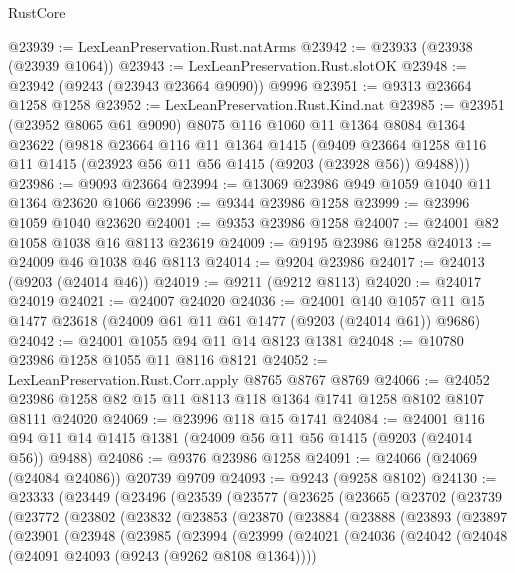 \begin{lexlean}{RustCore}
\begin{coremodule}
@23939 := LexLeanPreservation.Rust.natArms
@23942 := @23933 (@23938 (@23939 @1064))
@23943 := LexLeanPreservation.Rust.slotOK
@23948 := @23942 (@9243 (@23943 @23664 @9090)) @9996
@23951 := @9313 @23664 @1258 @1258
@23952 := LexLeanPreservation.Rust.Kind.nat
@23985 := @23951
    (@23952 @8065 @61 @9090)
    @8075
    @116
    @1060
    @11
    @1364
    @8084
    @1364
    @23622
    (@9818
      @23664
      @116
      @11
      @1364
      @1415
      (@9409 @23664 @1258 @116 @11 @1415 (@23923 @56 @11 @56 @1415 (@9203 (@23928 @56)) @9488)))
@23986 := @9093 @23664
@23994 := @13069 @23986 @949 @1059 @1040 @11 @1364 @23620 @1066
@23996 := @9344 @23986 @1258
@23999 := @23996 @1059 @1040 @23620
@24001 := @9353 @23986 @1258
@24007 := @24001 @82 @1058 @1038 @16 @8113 @23619
@24009 := @9195 @23986 @1258
@24013 := @24009 @46 @1038 @46 @8113
@24014 := @9204 @23986
@24017 := @24013 (@9203 (@24014 @46))
@24019 := @9211 (@9212 @8113)
@24020 := @24017 @24019
@24021 := @24007 @24020
@24036 := @24001
    @140
    @1057
    @11
    @15
    @1477
    @23618
    (@24009 @61 @11 @61 @1477 (@9203 (@24014 @61)) @9686)
@24042 := @24001 @1055 @94 @11 @14 @8123 @1381
@24048 := @10780 @23986 @1258 @1055 @11 @8116 @8121
@24052 := LexLeanPreservation.Rust.Corr.apply @8765 @8767 @8769
@24066 := @24052 @23986 @1258 @82 @15 @11 @8113 @118 @1364 @1741 @1258 @8102 @8107 @8111 @24020
@24069 := @23996 @118 @15 @1741
@24084 := @24001 @116 @94 @11 @14 @1415 @1381 (@24009 @56 @11 @56 @1415 (@9203 (@24014 @56)) @9488)
@24086 := @9376 @23986 @1258
@24091 := @24066 (@24069 (@24084 @24086)) @20739 @9709
@24093 := @9243 (@9258 @8102)
@24130 := @23333
    (@23449
      (@23496
        (@23539
          (@23577
            (@23625
              (@23665
                (@23702
                  (@23739
                    (@23772
                      (@23802
                        (@23832
                          (@23853
                            (@23870
                              (@23884
                                (@23888
                                  (@23893
                                    (@23897
                                      (@23901
                                        (@23948
                                          (@23985
                                            (@23994
                                              (@23999
                                                (@24021
                                                  (@24036
                                                    (@24042
                                                      (@24048
                                                        (@24091 @24093 (@9243 (@9262 @8108 @1364))))

\end{coremodule}
\end{lexlean}
